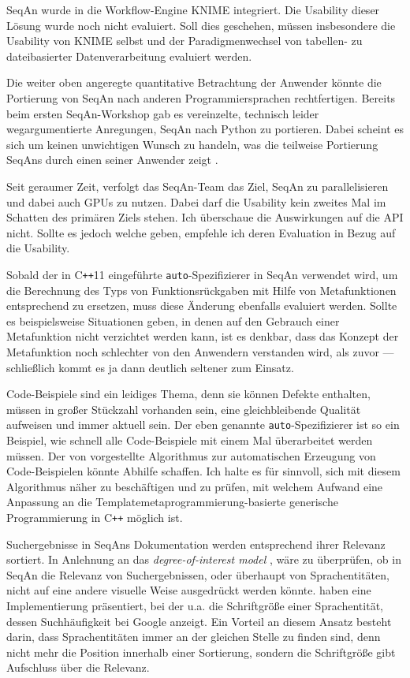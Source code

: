 SeqAn wurde in die Workflow-Engine KNIME integriert. Die Usability dieser Lösung wurde noch nicht evaluiert. Soll dies geschehen, müssen insbesondere die Usability von KNIME selbst und der Paradigmenwechsel von tabellen- zu dateibasierter Datenverarbeitung evaluiert werden.

Die weiter oben angeregte quantitative Betrachtung der Anwender könnte die Portierung von SeqAn nach anderen Programmiersprachen rechtfertigen. Bereits beim ersten SeqAn-Workshop gab es vereinzelte, technisch leider wegargumentierte Anregungen, SeqAn nach Python zu portieren. Dabei scheint es sich um keinen unwichtigen Wunsch zu handeln, was die teilweise Portierung SeqAns durch einen seiner Anwender zeigt \citep{Reid:R1ZT4-2v}.

Seit geraumer Zeit, verfolgt das SeqAn-Team das Ziel, SeqAn zu parallelisieren und dabei auch GPUs zu nutzen. Dabei darf die Usability kein zweites Mal im Schatten des primären Ziels stehen. Ich überschaue die Auswirkungen auf die API nicht. Sollte es jedoch welche geben, empfehle ich deren Evaluation in Bezug auf die Usability.

Sobald der in C\texttt{++}11 eingeführte \texttt{auto}-Spezifizierer in SeqAn verwendet wird, um die Berechnung des Typs von Funktionsrückgaben mit Hilfe von Metafunktionen entsprechend zu ersetzen, muss diese Änderung ebenfalls evaluiert werden. Sollte es beispielsweise Situationen geben, in denen auf den Gebrauch einer Metafunktion nicht verzichtet werden kann, ist es denkbar, dass das Konzept der Metafunktion noch schlechter von den Anwendern verstanden wird, als zuvor --- schließlich kommt es ja dann deutlich seltener zum Einsatz.

Code-Beispiele sind ein leidiges Thema, denn sie können Defekte enthalten, müssen in großer Stückzahl vorhanden sein, eine gleichbleibende Qualität aufweisen und immer aktuell sein. Der eben genannte \texttt{auto}-Spezifizierer ist so ein Beispiel, wie schnell alle Code-Beispiele mit einem Mal überarbeitet werden müssen. Der von \cite{Buse:2012vv} vorgestellte Algorithmus zur automatischen Erzeugung von Code-Beispielen könnte Abhilfe schaffen. Ich halte es für sinnvoll, sich mit diesem Algorithmus näher zu beschäftigen und zu prüfen, mit welchem Aufwand eine Anpassung an die Templatemetaprogrammierung-basierte generische Programmierung in C\texttt{++} möglich ist.

Suchergebnisse in SeqAns Dokumentation werden entsprechend ihrer Relevanz sortiert. In Anlehnung an das \textit{degree-of-interest model} \citep{Stylos:2008jt}, wäre zu überprüfen, ob in SeqAn die Relevanz von Suchergebnissen, oder überhaupt von Sprachentitäten, nicht auf eine andere visuelle Weise ausgedrückt werden könnte. \cite{Stylos:2009gc} haben eine Implementierung präsentiert, bei der u.a. die Schriftgröße einer Sprachentität, dessen Suchhäufigkeit bei Google anzeigt. Ein Vorteil an diesem Ansatz besteht darin, dass Sprachentitäten immer an der gleichen Stelle zu finden sind, denn nicht mehr die Position innerhalb einer Sortierung, sondern die Schriftgröße gibt Aufschluss über die Relevanz.

